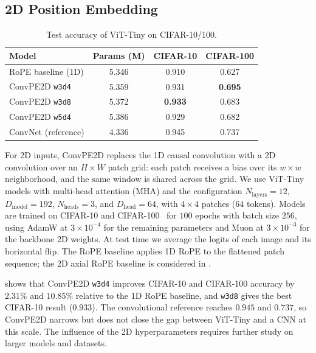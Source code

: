 \documentclass{article}
\begin{document}
\subsection{2D Position Embedding}
\label{sec:cifar}

\begin{table}[!ht]
\centering
\small
\begin{tabular}{lccc}
\toprule
Model & Params (M) & CIFAR-10 & CIFAR-100 \\
\midrule
RoPE baseline (1D)    & 5.346 & 0.910 & 0.627 \\
ConvPE2D \texttt{w3d4} & 5.359 & 0.931 & \textbf{0.695} \\
ConvPE2D \texttt{w3d8} & 5.372 & \textbf{0.933} & 0.683 \\
ConvPE2D \texttt{w5d4} & 5.386 & 0.929 & 0.682 \\
ConvNet (reference)    & 4.336 & 0.945 & 0.737 \\
\bottomrule
\end{tabular}
\caption{Test accuracy of ViT-Tiny on CIFAR-10/100.}
\label{tab:cifar}
\end{table}

For 2D inputs, ConvPE2D replaces the 1D causal convolution with a 2D convolution over an $H\times W$ patch grid: each patch receives a bias over its $w\times w$ neighborhood, and the same window is shared across the grid. We use ViT-Tiny models with multi-head attention (MHA) and the configuration $N_{\mathrm{layers}}=12$, $D_{\mathrm{model}}=192$, $N_{\mathrm{heads}}=3$, and $D_{\mathrm{head}}=64$, with $4\times4$ patches ($64$ tokens). Models are trained on CIFAR-10 and CIFAR-100~\cite{krizhevsky2009learning} for $100$ epochs with batch size $256$, using AdamW at $3\times10^{-4}$ for the remaining parameters and Muon at $3\times10^{-3}$ for the backbone 2D weights. At test time we average the logits of each image and its horizontal flip. The RoPE baseline applies 1D RoPE to the flattened patch sequence; the 2D axial RoPE baseline is considered in .

 shows that ConvPE2D \texttt{w3d4} improves CIFAR-10 and CIFAR-100 accuracy by $2.31\%$ and $10.85\%$ relative to the 1D RoPE baseline, and \texttt{w3d8} gives the best CIFAR-10 result ($0.933$). The convolutional reference reaches $0.945$ and $0.737$, so ConvPE2D narrows but does not close the gap between ViT-Tiny and a CNN at this scale. The influence of the 2D hyperparameters requires further study on larger models and datasets.
\end{document}
